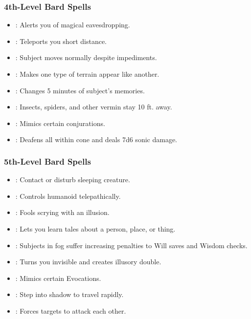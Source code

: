 \subsubsection{4th-Level Bard Spells}
\begin{itemize}
 \item {}: Alerts you of magical eavesdropping.
 \item {}: Teleports you short distance.
 \item {}: Subject moves normally despite impediments.
 \item {}: Makes one type of terrain appear like another.
 \item {}: Changes 5 minutes of subject's memories.
 \item {}: Insects, spiders, and other vermin stay 10 ft. away.
 \item {}: Mimics certain conjurations.
 \item {}: Deafens all within cone and deals 7d6 sonic damage.
\end{itemize}
\subsubsection{5th-Level Bard Spells}
\begin{itemize}
\item {}: Contact or disturb sleeping creature.
\item {}: Controls humanoid telepathically.
\item {}: Fools scrying with an illusion.
\item {}: Lets you learn tales about a person, place, or thing.
\item {}: Subjects in fog suffer increasing penalties to Will saves and Wisdom checks.
\item {}: Turns you invisible and creates illusory double.
\item {}: Mimics certain Evocations.
\item {}: Step into shadow to travel rapidly.
\item {}: Forces targets to attack each other.
\end{itemize}
